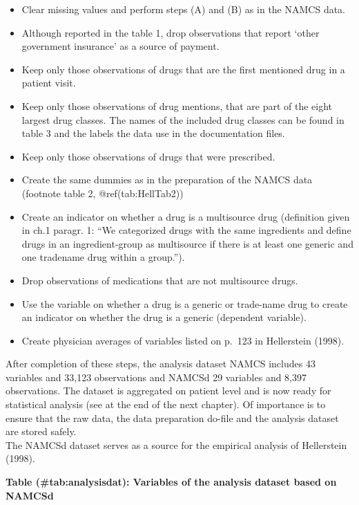 \documentclass[
]{book}
\providecommand{\tightlist}{%
  \setlength{\itemsep}{0pt}\setlength{\parskip}{0pt}}
\begin{document}
\begin{itemize}
\tightlist
\item
  Clear missing values and perform steps (A) and (B) as in the NAMCS
  data.
\item
  Although reported in the table 1, drop observations that report `other
  government insurance' as a source of payment.
\item
  Keep only those observations of drugs that are the first mentioned
  drug in a patient visit.
\item
  Keep only those observations of drug mentions, that are part of the
  eight largest drug classes. The names of the included drug classes can
  be found in table 3 and the labels the data use in the documentation
  files.
\item
  Keep only those observations of drugs that were prescribed.
\item
  Create the same dummies as in the preparation of the NAMCS data
  (footnote table 2, @ref(tab:HellTab2))
\item
  Create an indicator on whether a drug is a multisource drug
  (definition given in ch.1 paragr. 1: ``We categorized drugs with the
  same ingredients and define drugs in an ingredient-group as
  multisource if there is at least one generic and one tradename drug
  within a group.'').
\item
  Drop observations of medications that are not multisource drugs.
\item
  Use the variable on whether a drug is a generic or trade-name drug to
  create an indicator on whether the drug is a generic (dependent
  variable).
\item
  Create physician averages of variables listed on p.~123 in Hellerstein
  (1998).
\end{itemize}

After completion of these steps, the analysis dataset NAMCS includes 43
variables and 33,123 observations and NAMCSd 29 variables and 8,397
observations. The dataset is aggregated on patient level and is now
ready for statistical analysis (see at the end of the next chapter). Of
importance is to ensure that the raw data, the data preparation do-file
and the analysis dataset are stored safely.\\
The NAMCSd dataset serves as a source for the empirical analysis of
Hellerstein (1998).

\textbf{Table (\#tab:analysisdat): Variables of the analysis dataset
based on NAMCSd}
\end{document}
